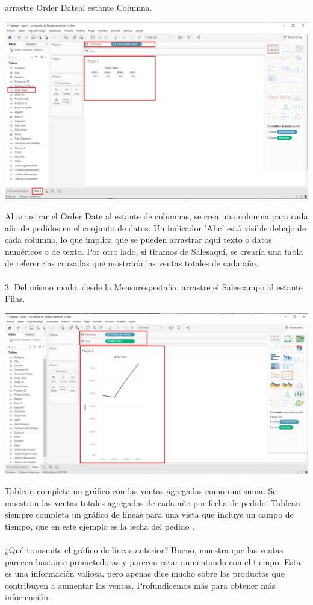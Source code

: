 \documentclass[12pt,letterpaper]{article}
\begin{document}
arrastre Order Dateal estante Columna.
\begin{center}
    \includegraphics[width=16cm]{img/6.png}  
\end{center}
Al arrastrar el Order Date al estante de columnas, se crea una columna para cada año de
pedidos en el conjunto de datos. Un indicador 'Abc' está visible debajo de cada columna, lo que
implica que se pueden arrastrar aquí texto o datos numéricos o de texto. Por otro lado, si
tiramos de Salesaquí, se crearía una tabla de referencias cruzadas que mostraría las ventas
totales de cada año.
\\\\3. Del mismo modo, desde la Measurespestaña, arrastre el Salescampo al estante Filas.
\begin{center}
    \includegraphics[width=16cm]{img/7.png}  
\end{center}
Tableau completa un gráfico con las ventas agregadas como una suma. Se muestran las ventas totales
agregadas de cada año por fecha de pedido. Tableau siempre completa un gráfico de líneas para una
vista que incluye un campo de tiempo, que en este ejemplo es la fecha del pedido .
\\\\¿Qué transmite el gráfico de líneas anterior? Bueno, muestra que las ventas parecen
bastante prometedoras y parecen estar aumentando con el tiempo. Esta es una
información valiosa, pero apenas dice mucho sobre los productos que contribuyen a
aumentar las ventas. Profundicemos más para obtener más información.
\end{document}
